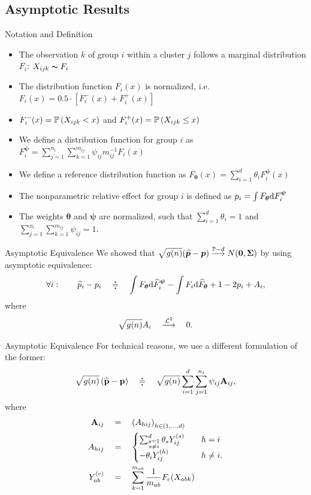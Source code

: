 \documentclass[xcolor=dvipsnames, aspectratio = 169]{beamer}
\begin{document}
\subsection*{Asymptotic Results}
\begin{frame}{Notation and Definition}
	\begin{itemize}
		\item The observation $k$ of group $i$ within a cluster $j$ follows a marginal distribution $F_i$: $X_{ijk} \thicksim F_i$ 
		\item The distribution function $F_i(x)$ is normalized, i.e. $F_i(x) = 0.5 \cdot [F_i^{-}(x) + F_i^{+}(x)]$ 
		\item $F_i^{-}(x) = \mathbb{P}\left(X_{ijk} < x\right)$ and $F_i^{+}(x) = \mathbb{P}\left(X_{ijk} \leq x\right)$
		\item We define a distribution function for group $i$ as $F_i^{\bm{\psi}} = \sum_{j=1}^{n_i}\sum_{k=1}^{m_{ij}}\psi_{ij}m_{ij}^{-1} F_i(x)$
		\item We define a reference distribution function as $F_{\bm{\theta}}(x) = \sum_{i=1}^d \theta_i F_i^{\bm{\psi}}(x)$
		\item The nonparametric relative effect for group $i$ is defined as $p_i = \int F_{\bm{\theta}}\mathrm{d} F_i^{\bm{\psi}}$
		\item The weights $\bm{\theta}$ and $\bm{\psi}$ are normalized, such that $\sum_{i=1}^d \theta_i = 1$ and $\sum_{j=1}^{n_i}\sum_{k=1}^{m_{ij}} \psi_{ij} = 1$.
	\end{itemize}
\end{frame}

\begin{frame}{Asymptotic Equivalence}
	We showed that $\sqrt{g(n)}(\widehat{\bm{p}} - \bm{p}) \stackrel{\mathbb{P}-d}{\longrightarrow} N(\bm{0}, \bm{\Sigma})$ by using asymptotic equivalence:\\
	$$\forall i: \qquad \widehat{p}_i - p_i \quad \aseq \quad \int F_{\bm{\theta}} \dif \widehat{F}_i^{\bm{\psi}} - \int F_i \dif \widehat{F}_{\bm{\theta}} + 1 - 2p_i + A_i,$$ where
	$$\sqrt{g(n)}A_i \quad \stackrel{\mathcal{L}^{2}}{\longrightarrow} \quad 0.$$
\end{frame}
\begin{frame}{Asymptotic Equivalence}
	For technical reasons, we use a different formulation of the former:
	\begin{equation*}
	\sqrt{g(n)}\left(\widehat{\vc{p}} - \vc{p}\right) \quad \aseq \quad \sqrt{g(n)} \sum_{i=1}^d\sum_{j=1}^{n_i} \psi_{ij} \vc{A}_{ij},
\end{equation*}
where \begin{align*}
	\mathbf{A}_{ij} \quad &= \quad \left(A_{hij}\right)_{h \in (1,...,d)} \\
	A_{hij} \quad &= \quad \begin{cases}
		\sum_{\substack{s=1 \\ s \neq i}}^d \theta_s Y_{ij}^{(s)} &\quad h = i \\
	- \theta_i Y_{ij}^{(h)} &\quad h \neq i.
	\end{cases} \\
	Y_{ab}^{(c)} \quad &= \quad \sum_{k=1}^{m_{ab}} \frac{1}{m_{ab}}F_{c}(X_{abk})
\end{align*}
\end{frame}
\end{document}
